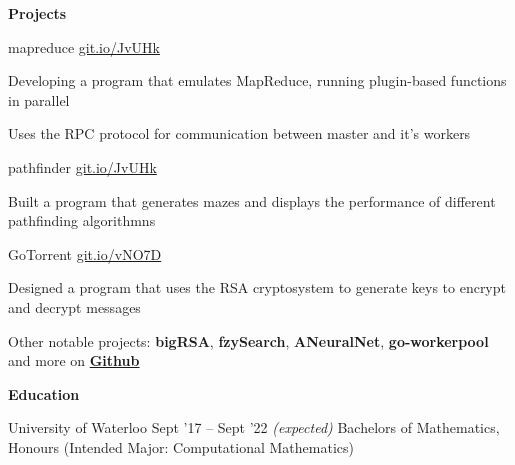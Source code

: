 \documentclass{resume} %
\DeclareRobustCommand{\&}{%
  \ifdim\fontdimen1\font>0pt
    \textsl{\symbol{`\&}}%
  \else
    \symbol{`\&}%
  \fi
}
\begin{document}

\begin{rSection}{\textbf{Projects}}

\begin{rProjectSection}{mapreduce}
		{{\href{https://github.com/MSJawad/pathfinder}
				{git.io/JvUHk}}}
			\item Developing a program that emulates MapReduce, running plugin-based functions in parallel
			\item Uses the RPC protocol for communication between master and it's workers
		
	\end{rProjectSection}

  \begin{rProjectSection}{pathfinder}
	  {{\href{https://github.com/MSJawad/pathfinder}
		    {git.io/JvUHk}}}

    \item Built a program that generates mazes and displays the performance of different pathfinding algorithmns
    
    \end{rProjectSection}

\begin{rProjectSection}{GoTorrent}
	{{\href{https://github.com/MSJawad/bigRSA}
			{git.io/vNO7D}}}
	
	\item Designed a program that uses the RSA cryptosystem to generate keys to encrypt and decrypt messages
	
\end{rProjectSection}
    
	
\begin{rMinisection}
      \item {Other notable projects:} {\textbf{bigRSA}},{ \textbf{fzySearch}},
     {\textbf{ANeuralNet}}, {\textbf{go-workerpool}} and more on
      \href{https://github.com/MSJawad}{\textbf{Github}}
 \end{rMinisection}
\end{rSection}


\begin{rSection}{\textbf{Education}}
  \begin{rEducationSection}{University of Waterloo}
		     {Sept '17 -- Sept '22 \emph{(expected)}}
		     {Bachelors of Mathematics, Honours (Intended Major: Computational Mathematics)}
  \end{rEducationSection}
\end{rSection} 
\end{document}
